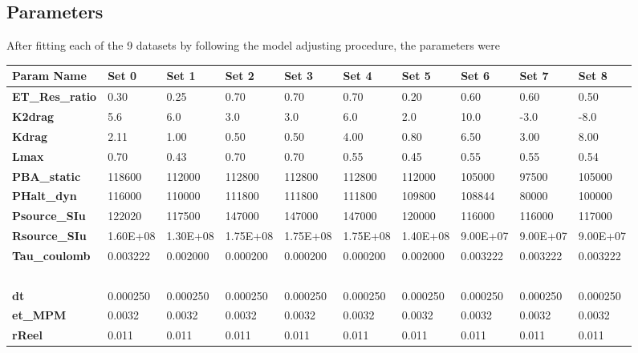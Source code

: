 \documentclass[letterpaper]{article}
\begin{document}
\begin{landscape}
\section{Parameters}
After fitting each of the 9 datasets by following the model adjusting procedure, the parameters were
\begin{table}[!ht]
    \centering
    \begin{tabular}{|l|l|l|l|l|l|l|l|l|l|}
    \hline
        \textbf{Param Name} & \textbf{Set 0} & \textbf{Set 1} & \textbf{Set 2} & \textbf{Set 3} & \textbf{Set 4} & \textbf{Set 5} & \textbf{Set 6} & \textbf{Set 7} & \textbf{Set 8} \\ \hline
        \textbf{ET\_Res\_ratio} & 0.30 & 0.25 & 0.70 & 0.70 & 0.70 & 0.20 & 0.60 & 0.60 & 0.50 \\ \hline
        \textbf{K2drag} & 5.6 & 6.0 & 3.0 & 3.0 & 6.0 & 2.0 & 10.0 & -3.0 & -8.0 \\ \hline
        \textbf{Kdrag} & 2.11 & 1.00 & 0.50 & 0.50 & 4.00 & 0.80 & 6.50 & 3.00 & 8.00 \\ \hline
        \textbf{Lmax} & 0.70 & 0.43 & 0.70 & 0.70 & 0.55 & 0.45 & 0.55 & 0.55 & 0.54 \\ \hline
        \textbf{PBA\_static} & 118600 & 112000 & 112800 & 112800 & 112800 & 112000 & 105000 & 97500 & 105000 \\ \hline
        \textbf{PHalt\_dyn} & 116000 & 110000 & 111800 & 111800 & 111800 & 109800 & 108844 & 80000 & 100000 \\ \hline
        \textbf{Psource\_SIu} & 122020 & 117500 & 147000 & 147000 & 147000 & 120000 & 116000 & 116000 & 117000 \\ \hline
        \textbf{Rsource\_SIu} & 1.60E+08 & 1.30E+08 & 1.75E+08 & 1.75E+08 & 1.75E+08 & 1.40E+08 & 9.00E+07 & 9.00E+07 & 9.00E+07 \\ \hline
        \textbf{Tau\_coulomb} & 0.003222 & 0.002000 & 0.000200 & 0.000200 & 0.000200 & 0.002000 & 0.003222 & 0.003222 & 0.003222 \\ \hline
        \textbf{} & ~ & ~ & ~ & ~ & ~ & ~ & ~ & ~ & ~ \\ \hline
        \textbf{dt} & 0.000250 & 0.000250 & 0.000250 & 0.000250 & 0.000250 & 0.000250 & 0.000250 & 0.000250 & 0.000250 \\ \hline
        \textbf{et\_MPM} & 0.0032 & 0.0032 & 0.0032 & 0.0032 & 0.0032 & 0.0032 & 0.0032 & 0.0032 & 0.0032 \\ \hline
        \textbf{rReel} & 0.011 & 0.011 & 0.011 & 0.011 & 0.011 & 0.011 & 0.011 & 0.011 & 0.011 \\ \hline

\end{tabular}
\end{table}
\end{landscape}
\end{document}
